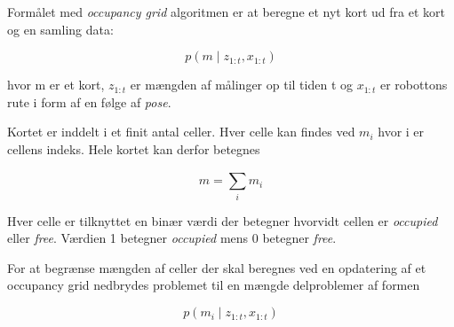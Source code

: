 Formålet med \textit{occupancy grid} algoritmen er at beregne	et nyt kort ud fra et kort og en samling data:

\[ p(m \mid z_{1:t}, x_{1:t}) \]

hvor m er et kort, $ z_{1:t} $ er mængden af målinger op til tiden t og $ x_{1:t} $ er robottons rute i form af en følge af \textit{pose}.

Kortet er inddelt i et finit antal celler.
Hver celle kan findes ved $ m_i $ hvor i er cellens indeks. 
Hele kortet kan derfor betegnes

\[  m = \sum_{i}^{} m_i \]

Hver celle er tilknyttet en binær værdi der betegner hvorvidt cellen er \textit{occupied} eller \textit{free}.
Værdien 1 betegner \textit{occupied} mens 0 betegner \textit{free}.

For at begrænse mængden af celler der skal beregnes ved en opdatering af et occupancy grid nedbrydes problemet til en mængde delproblemer af formen

\[ p(m_i \mid z_{1:t}, x_{1:t}) \]

